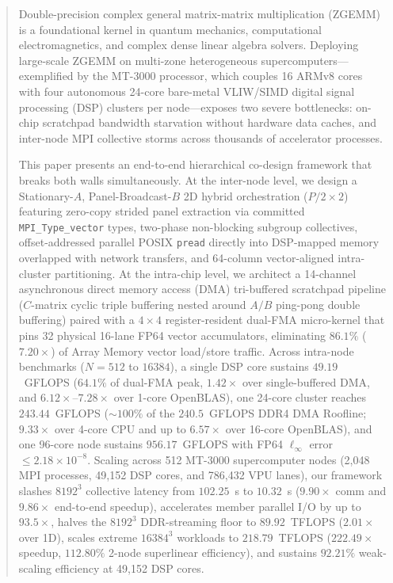 \documentclass[journal]{IEEEtran}
\begin{document}
\begin{abstract}
Double-precision complex general matrix-matrix multiplication (ZGEMM) is a foundational kernel in quantum mechanics, computational electromagnetics, and complex dense linear algebra solvers. Deploying large-scale ZGEMM on multi-zone heterogeneous supercomputers---exemplified by the MT-3000 processor, which couples 16 ARMv8 cores with four autonomous 24-core bare-metal VLIW/SIMD digital signal processing (DSP) clusters per node---exposes two severe bottlenecks: on-chip scratchpad bandwidth starvation without hardware data caches, and inter-node MPI collective storms across thousands of accelerator processes.

This paper presents an end-to-end hierarchical co-design framework that breaks both walls simultaneously. At the inter-node level, we design a Stationary-$A$, Panel-Broadcast-$B$ 2D hybrid orchestration ($P/2 \times 2$) featuring zero-copy strided panel extraction via committed \texttt{MPI\_Type\_vector} types, two-phase non-blocking subgroup collectives, offset-addressed parallel POSIX \texttt{pread} directly into DSP-mapped memory overlapped with network transfers, and 64-column vector-aligned intra-cluster partitioning. At the intra-chip level, we architect a 14-channel asynchronous direct memory access (DMA) tri-buffered scratchpad pipeline ($C$-matrix cyclic triple buffering nested around $A/B$ ping-pong double buffering) paired with a $4 \times 4$ register-resident dual-FMA micro-kernel that pins 32 physical 16-lane FP64 vector accumulators, eliminating $86.1\%$ ($7.20\times$) of Array Memory vector load/store traffic. Across intra-node benchmarks ($N=512$ to $16384$), a single DSP core sustains $49.19$~GFLOPS ($64.1\%$ of dual-FMA peak, $1.42\times$ over single-buffered DMA, and $6.12\times$--$7.28\times$ over 1-core OpenBLAS), one 24-core cluster reaches $243.44$~GFLOPS ($\sim\!100\%$ of the $240.5$~GFLOPS DDR4 DMA Roofline; $9.33\times$ over 4-core CPU and up to $6.57\times$ over 16-core OpenBLAS), and one 96-core node sustains $956.17$~GFLOPS with FP64 $\ell_\infty$ error $\le 2.18 \times 10^{-8}$. Scaling across 512 MT-3000 supercomputer nodes (2,048 MPI processes, 49,152 DSP cores, and 786,432 VPU lanes), our framework slashes $8192^3$ collective latency from $102.25$~s to $10.32$~s ($9.90\times$ comm and $9.86\times$ end-to-end speedup), accelerates member parallel I/O by up to $93.5\times$, halves the $8192^3$ DDR-streaming floor to $89.92$~TFLOPS ($2.01\times$ over 1D), scales extreme $16384^3$ workloads to $218.79$~TFLOPS ($222.49\times$ speedup, $112.80\%$ 2-node superlinear efficiency), and sustains $92.21\%$ weak-scaling efficiency at 49,152 DSP cores.
\end{abstract}
\end{document}
